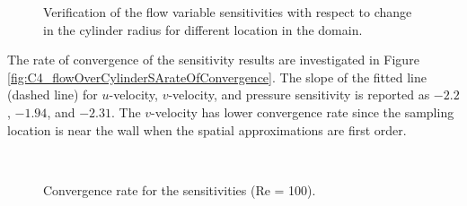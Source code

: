 \begin{figure}[H]
{    }
    \quad
    \caption{Verification of the flow variable sensitivities with respect to change in the cylinder radius for different location in the domain.}
    \label{fig:C4_flowOverCylinderSensitivityValidation}
\end{figure}

The rate of convergence of the sensitivity results are investigated in Figure \ref{fig:C4_flowOverCylinderSArateOfConvergence}. The slope of the fitted line (dashed line) for $u$-velocity, $v$-velocity, and pressure sensitivity is reported as $-2.2$, $-1.94$, and $-2.31$. The $v$-velocity has lower convergence rate since the sampling location is near the wall when the spatial approximations are first order.

\begin{figure}[H]
    \centering
    \quad
    \\
    \caption{Convergence rate for the sensitivities (Re = 100).}
    \label{fig:C4_flowOverCylinderSAmeshConvergence}
\end{figure}